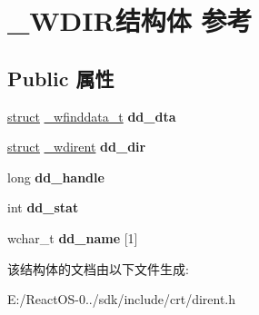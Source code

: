 \hypertarget{struct___w_d_i_r}{}\section{\+\_\+\+W\+D\+I\+R结构体 参考}
\label{struct___w_d_i_r}
\subsection*{Public 属性}
\begin{DoxyCompactItemize}
\item 
\mbox{\label{struct___w_d_i_r_a06b42ae9764f19cc8f5b19483fa43bec}} 
\hyperlink{interfacestruct}{struct} \hyperlink{struct__wfinddata__t}{\+\_\+wfinddata\+\_\+t} {\bfseries dd\+\_\+dta}
\item 
\mbox{\label{struct___w_d_i_r_af2a1ed5cc44967b223f3190d49fe07b9}} 
\hyperlink{interfacestruct}{struct} \hyperlink{struct__wdirent}{\+\_\+wdirent} {\bfseries dd\+\_\+dir}
\item 
\mbox{\label{struct___w_d_i_r_ad5535a8e453c42a846e77c298bce1bac}} 
long {\bfseries dd\+\_\+handle}
\item 
\mbox{\label{struct___w_d_i_r_a8f62004df13a408eb913c6132bd15b12}} 
int {\bfseries dd\+\_\+stat}
\item 
\mbox{\label{struct___w_d_i_r_ac8c2cb677c91e81729fa00dd745d9ae6}} 
wchar\+\_\+t {\bfseries dd\+\_\+name} \mbox{[}1\mbox{]}
\end{DoxyCompactItemize}


该结构体的文档由以下文件生成\+:\begin{DoxyCompactItemize}
\item 
E\+:/\+React\+O\+S-\/0../sdk/include/crt/dirent.\+h\end{DoxyCompactItemize}
